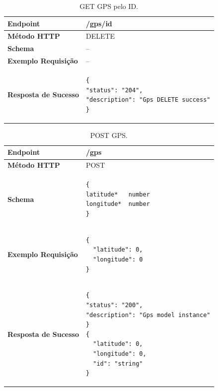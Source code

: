 \begin{apendicesenv}
\begin{table}[H]
\begin{tabular}{|l|l|}
\hline
\textbf{Endpoint}            & /gps/{id} \\ \hline
\textbf{Método HTTP}         & DELETE \\ \hline
\textbf{Schema}              & -- \\ \hline
\textbf{Exemplo Requisição}  & -- \\ \hline
\textbf{Resposta de Sucesso} &
\begin{lstlisting}
{
"status": "204",
"description": "Gps DELETE success"
}
\end{lstlisting}
\\ \hline
\end{tabular}
\caption{GET GPS pelo ID.}
\label{delete_gps}
\end{table}


\begin{table}[H]
\begin{tabular}{|l|l|}
\hline
\textbf{Endpoint}            & /gps \\ \hline
\textbf{Método HTTP}         & POST \\ \hline
\textbf{Schema}              & 
\begin{lstlisting}
{
latitude*	number
longitude*	number
}
\end{lstlisting} \\ \hline
\textbf{Exemplo Requisição}  & 
\begin{lstlisting}
{
  "latitude": 0,
  "longitude": 0
}
\end{lstlisting} \\ \hline
\textbf{Resposta de Sucesso} &
\begin{lstlisting}
{
"status": "200",
"description": "Gps model instance"
}
{
  "latitude": 0,
  "longitude": 0,
  "id": "string"
}
\end{lstlisting}
\\ \hline
\end{tabular}
\caption{POST GPS.}
\label{post_gps}
\end{table}



\end{apendicesenv}

